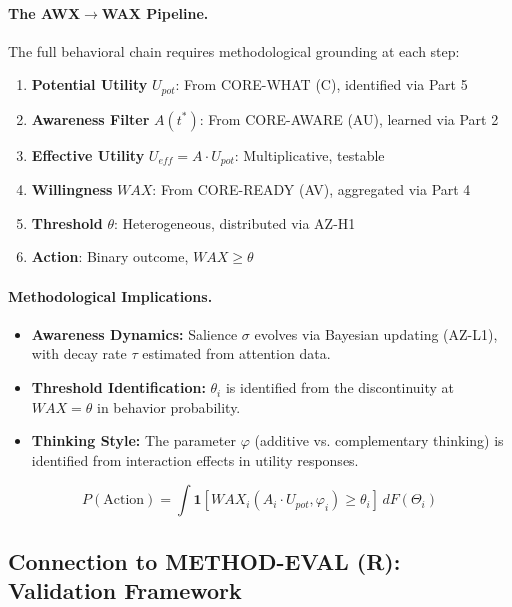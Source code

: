 \paragraph{The AWX$\to$WAX Pipeline.}
The full behavioral chain requires methodological grounding at each step:

\begin{enumerate}
\item \textbf{Potential Utility} $U_{pot}$: From CORE-WHAT (C), identified via Part 5
\item \textbf{Awareness Filter} $A(t^*)$: From CORE-AWARE (AU), learned via Part 2
\item \textbf{Effective Utility} $U_{eff} = A \cdot U_{pot}$: Multiplicative, testable
\item \textbf{Willingness} $WAX$: From CORE-READY (AV), aggregated via Part 4
\item \textbf{Threshold} $\theta$: Heterogeneous, distributed via AZ-H1
\item \textbf{Action}: Binary outcome, $WAX \geq \theta$
\end{enumerate}

\paragraph{Methodological Implications.}

\begin{itemize}
\item \textbf{Awareness Dynamics:} Salience $\sigma$ evolves via Bayesian updating
(AZ-L1), with decay rate $\tau$ estimated from attention data.

\item \textbf{Threshold Identification:} $\theta_i$ is identified from the
discontinuity at $WAX = \theta$ in behavior probability.

\item \textbf{Thinking Style:} The parameter $\varphi$ (additive vs. complementary
thinking) is identified from interaction effects in utility responses.
\end{itemize}

\begin{equation}
\boxed{
P(\text{Action}) = \int \mathbf{1}[WAX_i(A_i \cdot U_{pot}, \varphi_i) \geq \theta_i] \, dF(\Theta_i)
}
\end{equation}

\subsection{Connection to METHOD-EVAL (R): Validation Framework}

